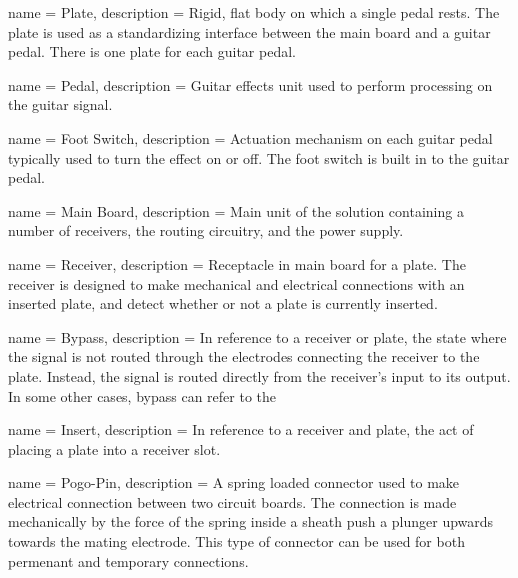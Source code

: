  {
	name = Plate,
	description = {Rigid, flat body on which a single pedal rests.  The plate is used as a standardizing interface between the main board and a guitar pedal.  There is one plate for each guitar pedal.}
}

 {
	name = Pedal,
	description = {Guitar effects unit used to perform processing on the guitar signal.}
}

 {
	name = {Foot Switch},
	description = {Actuation mechanism on each guitar pedal typically used to turn the effect on or off.  The foot switch is built in to the guitar pedal.}
}

 {
	name = {Main Board},
	description = {Main unit of the solution containing a number of receivers, the routing circuitry, and the power supply.}
}

 {
	name = {Receiver},
	description = {Receptacle in main board for a plate.  The receiver is designed to make mechanical and electrical connections with an inserted plate, and detect whether or not a plate is currently inserted.}
}

 {
	name = {Bypass},
	description = {In reference to a receiver or plate, the state where the signal is not routed through the electrodes connecting the receiver to the plate.  Instead, the signal is routed directly from the receiver's input to its output.  In some other cases, bypass can refer to the }
}

 {
	name = {Insert},
	description = {In reference to a receiver and plate, the act of placing a plate into a receiver slot.}
}

 {
	name = {Pogo-Pin}, 
	description = {A spring loaded connector used to make electrical connection between two circuit boards.  The connection is made mechanically by the force of the spring inside a sheath push a plunger upwards towards the mating electrode.  This type of connector can be used for both permenant and temporary connections.}
}